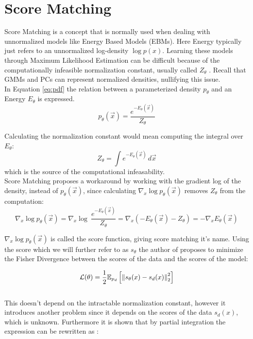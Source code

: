 \section{Score Matching}
\label{sec:sm}

Score Matching \cite{sm} is a concept that is normally used when dealing with unnormalized models like Energy Based Models (EBMs). Here 
Energy typically just refers to an unnormalized log-density $\log p(x)$. 
Learning these models through Maximum Likelihood Estimation can be difficult because of the computationally infeasible normalization 
constant, usually called $Z_\theta$ \cite{sm}. Recall that GMMs and PCs can represent normalized densities, nullifying this issue. \\

In Equation \ref{eq:pdf} the relation between a parameterized density $p_\theta$ and an Energy $E_\theta$ is expressed. 
\begin{equation}
    \label{eq:pdf}
    p_\theta(\vec x) = \frac{e^{-E_\theta(\vec x)}}{Z_\theta}
\end{equation} 

Calculating the normalization constant would mean computing the integral over $E_\theta$: 
\[
    Z_\theta = \int e^{-E_\theta(\vec{x})} \, d\vec{x}
\]
which is the source of the computational infeasability. \\

Score Matching proposes a workaround by working with the gradient log of the density, 
instead of $p_\theta(\vec x)$, since calculating $\nabla_x \log p_\theta(\vec x)$ removes $Z_\theta$ from the computation:
\[
    \nabla_x \log p_\theta(\vec x) = \nabla_x \log \ \frac{e^{- E_\theta(\vec x)}}{Z_\theta} = \nabla_x \left( - E_\theta(\vec x) - {Z_\theta} \right) = - \nabla_x E_\theta(\vec x)
\] 

$\nabla_x \log p_\theta(\vec x)$ is called the score function, giving score matching it's name.
Using the score which we will further refer to as $s_\theta$ the author of \cite{sm} proposes to minimize the Fisher Divergence between 
the scores of the data and the scores of the model: 

\begin{equation}
    \label{eq:fisher}
    \mathcal{L}(\theta) = \frac{1}{2} \mathbb{E}_{p_d} \left[ \left\lVert s_\theta(x) - s_d(x)\right\rVert^2_2 \right]
\end{equation} \\

This doesn't depend on the intractable normalization constant, however it introduces another problem since it depends on the scores of the data 
$s_d(x)$, which is unknown. Furthermore it is shown that by partial integration the expression can be rewritten as \cite{sm}:

